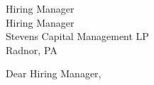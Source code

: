 \documentclass[10pt,letter]{letter}
\def\hm{Hiring Manager}
\begin{document}
\begin{letter}{\hm \\ Hiring Manager \\ Stevens Capital Management LP \\ Radnor, PA}

\opening{Dear \hm,}

\setlength\parindent{.5in}



 

\end{letter}
\end{document}
